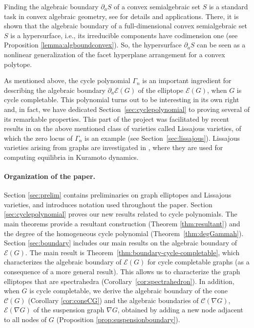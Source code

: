 \documentclass[a4paper, 11pt, twoside]{article}
\newcommand{\ME}{{\mathcal E}}
\newcommand{\MCscr}{{\mathscr {C}}}
\theoremstyle{plain}
\begin{document}
Finding the algebraic boundary $\partial_a S$ of a convex semialgebraic set $S$ is a standard task in convex algebraic geometry, see  \cite{sinn2015algebraicboundary} for  details and applications.  
There,  it is shown that the algebraic boundary of a full-dimensional convex semialgebraic set $S$ is a hypersurface, i.e., its irreducible components have codimension one (see Proposition \ref{lemma:algboundconvex}).
So, the hypersurface $\partial_a S$ can be seen as a nonlinear generalization of the facet hyperplane arrangement for a convex polytope. 


As mentioned above, the cycle polynomial $\Gamma_n$ is an important ingredient for describing the algebraic boundary $\partial_a \ME(G)$ of the  elliptope $\ME(G)$, when $G$ is cycle completable. 
This polynomial turns out to be interesting in its own right and, in fact, we have dedicated Section~\ref{sec:cyclepolynomial} to proving several of its remarkable properties. This part of the project was facilitated by recent results in \cite{mascarin2025lissajousvarieties} on the above mentioned class of varieties called Lissajous varieties, of which the zero locus of $\Gamma_n$ is an example (see Section~\ref{sec:lissajous}).
Lissajous varieties arising from graphs are investigated in  \cite[Section 4]{mascarin2025lissajousvarieties}, where they are used for computing equilibria in Kuramoto dynamics.
    
 
\paragraph{Organization of the paper.}
Section \ref{sec:prelim} contains preliminaries on graph elliptopes and Lissajous varieties, and introduces notation used throughout the paper. Section \ref{sec:cyclepolynomial} proves our new results related to cycle polynomials. The main theorems provide a resultant construction (Theorem \ref{thm:resultant}) and the degree of the homogeneous cycle polynomial (Theorem~\ref{thm:degGammah}). Section \ref{sec:boundary} includes our main results on the algebraic boundary of $\ME(G)$. The main result is Theorem~\ref{thm:boundary-cycle-completable}, which characterizes the algebraic boundary of $\ME(G)$ for cycle completable graphs (as a consequence of a more general result). 
This allows us  to characterize the graph elliptopes that are spectrahedra (Corollary~\ref{cor:spectrahedron}). In addition, when $G$ is cycle completable, we derive the algebraic boundary of the cone $\MCscr(G)$ (Corollary \ref{cor:coneCG}) and the algebraic boundaries of $\MCscr(\nabla G)$, $\ME(\nabla G)$ of the suspension graph $\nabla G$, obtained by   adding a new node adjacent to all nodes of $G$ (Proposition \ref{prop:suspensionboundary}).
\end{document}

